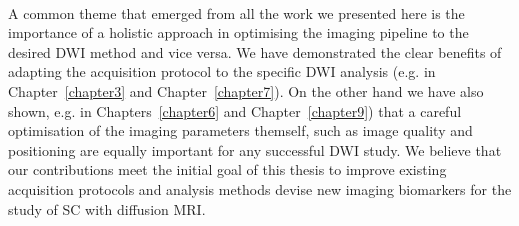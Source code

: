 \paragraph{}
A common theme that emerged from all the work we presented here is the importance of a holistic approach in optimising the imaging pipeline to the desired \gls{DWI} method and vice versa. We have demonstrated the clear benefits of adapting the acquisition protocol to the specific \gls{DWI} analysis (e.g. in Chapter~\ref{chapter3} and Chapter~\ref{chapter7}). On the other hand we have also shown, e.g. in Chapters~\ref{chapter6} and Chapter~\ref{chapter9}) that a careful optimisation of the imaging parameters themself, such as image quality and positioning are equally important for any successful \gls{DWI} study. We believe that our contributions meet the initial goal of this thesis to improve existing acquisition protocols and analysis methods devise new imaging biomarkers for the study of \gls{SC} with diffusion MRI.
% 

